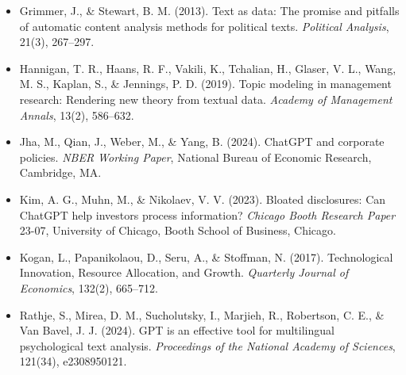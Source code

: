 \documentclass[11pt]{article}
\begin{document}
\begin{itemize}
    \item Grimmer, J., \& Stewart, B. M. (2013). Text as data: The promise and pitfalls of automatic content analysis methods for political texts. \textit{Political Analysis}, 21(3), 267--297.
    \item Hannigan, T. R., Haans, R. F., Vakili, K., Tchalian, H., Glaser, V. L., Wang, M. S., Kaplan, S., \& Jennings, P. D. (2019). Topic modeling in management research: Rendering new theory from textual data. \textit{Academy of Management Annals}, 13(2), 586--632.
    \item Jha, M., Qian, J., Weber, M., \& Yang, B. (2024). ChatGPT and corporate policies. \textit{NBER Working Paper}, National Bureau of Economic Research, Cambridge, MA.
    \item Kim, A. G., Muhn, M., \& Nikolaev, V. V. (2023). Bloated disclosures: Can ChatGPT help investors process information? \textit{Chicago Booth Research Paper} 23-07, University of Chicago, Booth School of Business, Chicago.
    \item Kogan, L., Papanikolaou, D., Seru, A., \& Stoffman, N. (2017). Technological Innovation, Resource Allocation, and Growth. \textit{Quarterly Journal of Economics}, 132(2), 665--712.
    \item Rathje, S., Mirea, D. M., Sucholutsky, I., Marjieh, R., Robertson, C. E., \& Van Bavel, J. J. (2024). GPT is an effective tool for multilingual psychological text analysis. \textit{Proceedings of the National Academy of Sciences}, 121(34), e2308950121.
\end{itemize}
\end{document}
